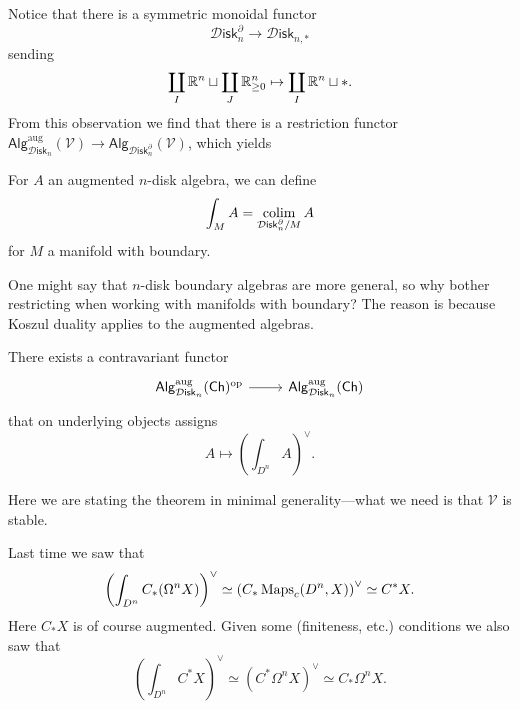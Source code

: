 \documentclass{amsart}
\begin{document}
Notice that there is a symmetric monoidal functor
\begin{equation*}
    \mathcal{D}\mathsf{isk}_n^\partial \to \mathcal{D}\mathsf{isk}_{n,*}
\end{equation*}
sending
\begin{equation*}
    \coprod_I\mathbb{R}^n\sqcup\coprod_J\mathbb{R}^n_{\geq 0} \mapsto \coprod_I\mathbb{R}^n\sqcup *.
\end{equation*}
From this observation we find that there is a restriction functor
$\mathsf{Alg}_{\mathcal{D}\mathsf{isk}_n}^\text{aug}(\mathcal{V})\to\mathsf{Alg}_{\mathcal{D}\mathsf{isk}_n^\partial}(\mathcal{V})$,
which yields
\begin{corollary}
    For $A$ an augmented $n$-disk algebra, we can define
    \begin{equation*}
        \int_M A = \operatorname*{colim}_{\mathcal{D}\mathsf{isk}_n^\partial/M} A
    \end{equation*}
    for $M$ a manifold with boundary.
\end{corollary}
One might say that $n$-disk boundary algebras are more general, so why bother
restricting when working with manifolds with boundary? The reason is because
Koszul duality applies to the augmented algebras.

\begin{theorem}
    There exists a contravariant functor
    \begin{equation*}
        \begin{tikzcd}
            \mathsf{Alg}_{\mathcal{D}\mathsf{isk}_n}^\text{aug}(\mathsf{Ch})^\text{op} \rar & \mathsf{Alg}_{\mathcal{D}\mathsf{isk}_n}^\text{aug}(\mathsf{Ch})
        \end{tikzcd}
    \end{equation*}
    that on underlying objects assigns
    \begin{equation*}
        A\mapsto \left(\int_{D^n} A\right)^\vee.
    \end{equation*}
\end{theorem}
Here we are stating the theorem in minimal generality---what we need is that $\mathcal{V}$ is stable.

Last time we saw that
\begin{equation*}
    \left(\int_{D^n}C_*(\Omega^nX)\right)^\vee \simeq  \left( C_*\operatorname{Maps}_c(D^n,X) \right)^\vee \simeq C^*X.
\end{equation*}
Here $C_*X$ is of course augmented. Given some (finiteness, etc.) conditions we also saw that
\begin{equation*}
    \left(\int_{D^n}C^*X\right)^\vee \simeq \left(C^*\Omega^nX\right)^\vee \simeq C_*\Omega^nX.
\end{equation*}
\end{document}
